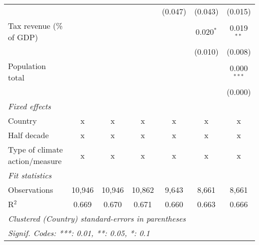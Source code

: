 \begin{tabular}{lcccccc}
                                              &         &               &                & (0.047)        & (0.043)        & (0.015)\\   
   Tax revenue (\% of GDP)                    &         &               &                &                & 0.020$^{*}$    & 0.019$^{**}$\\   
                                              &         &               &                &                & (0.010)        & (0.008)\\   
   Population total                           &         &               &                &                &                & 0.000$^{***}$\\   
                                              &         &               &                &                &                & (0.000)\\   
   \emph{Fixed effects}\\
   Country                                    & x       & x             & x              & x              & x              & x\\  
   Half decade                                & x       & x             & x              & x              & x              & x\\  
   Type of climate action/measure             & x       & x             & x              & x              & x              & x\\  
   \midrule \emph{Fit statistics}\\
   Observations                               & 10,946  & 10,946        & 10,862         & 9,643          & 8,661          & 8,661\\  
   R$^2$                                      & 0.669   & 0.670         & 0.671          & 0.660          & 0.663          & 0.666\\  
   \midrule
   \multicolumn{7}{l}{\emph{Clustered (Country) standard-errors in parentheses}}\\
   \multicolumn{7}{l}{\emph{Signif. Codes: ***: 0.01, **: 0.05, *: 0.1}}\\
\end{tabular}
\par\endgroup


